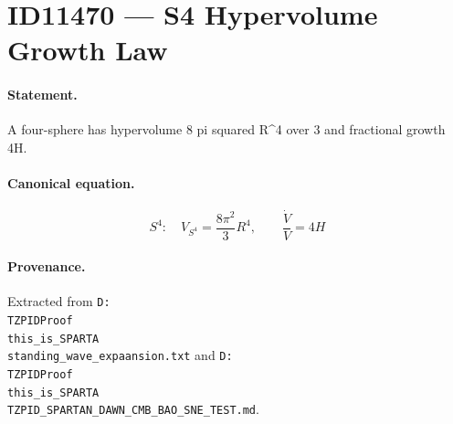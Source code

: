 \section*{ID11470 --- S4 Hypervolume Growth Law}

\paragraph{Statement.}
A four-sphere has hypervolume 8 pi squared R^4 over 3 and fractional growth 4H.

\paragraph{Canonical equation.}
\[
S^4:\quad V_{S^4}=\frac{8\pi^2}{3}R^4,\qquad\frac{\dot V}{V}=4H
\]

\paragraph{Provenance.}
Extracted from \texttt{D:\\TZPIDProof\\this\_is\_SPARTA\\standing\_wave\_expaansion.txt} and \texttt{D:\\TZPIDProof\\this\_is\_SPARTA\\TZPID\_SPARTAN\_DAWN\_CMB\_BAO\_SNE\_TEST.md}.
